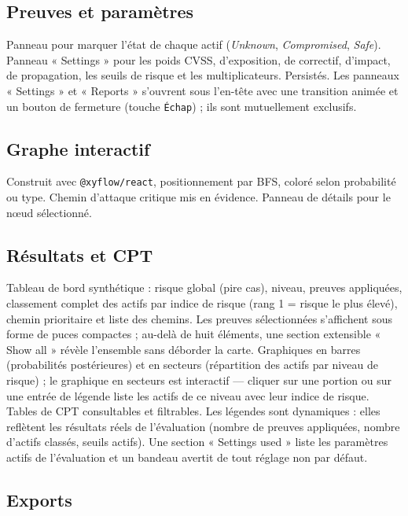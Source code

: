 \documentclass[12pt,a4paper]{article}
\newcommand{\forcereset}[1]{}
\begin{document}
\subsection{Preuves et paramètres}
\forcereset{4}

Panneau pour marquer l'état de chaque actif (\emph{Unknown}, \emph{Compromised}, \emph{Safe}). Panneau « Settings » pour les poids CVSS, d'exposition, de correctif, d'impact, de propagation, les seuils de risque et les multiplicateurs. Persistés. Les panneaux « Settings » et « Reports » s'ouvrent sous l'en-tête avec une transition animée et un bouton de fermeture (touche \texttt{Échap}) ; ils sont mutuellement exclusifs.

\subsection{Graphe interactif}
\forcereset{4}

Construit avec \texttt{@xyflow/react}, positionnement par BFS, coloré selon probabilité ou type. Chemin d'attaque critique mis en évidence. Panneau de détails pour le nœud sélectionné.

\subsection{Résultats et CPT}
\forcereset{4}

Tableau de bord synthétique : risque global (pire cas), niveau, preuves appliquées, classement complet des actifs par indice de risque (rang 1 = risque le plus élevé), chemin prioritaire et liste des chemins. Les preuves sélectionnées s'affichent sous forme de puces compactes ; au-delà de huit éléments, une section extensible « Show all » révèle l'ensemble sans déborder la carte. Graphiques en barres (probabilités postérieures) et en secteurs (répartition des actifs par niveau de risque) ; le graphique en secteurs est interactif — cliquer sur une portion ou sur une entrée de légende liste les actifs de ce niveau avec leur indice de risque. Tables de CPT consultables et filtrables. Les légendes sont dynamiques : elles reflètent les résultats réels de l'évaluation (nombre de preuves appliquées, nombre d'actifs classés, seuils actifs). Une section « Settings used » liste les paramètres actifs de l'évaluation et un bandeau avertit de tout réglage non par défaut.

\subsection{Exports}
\forcereset{4}
\end{document}
